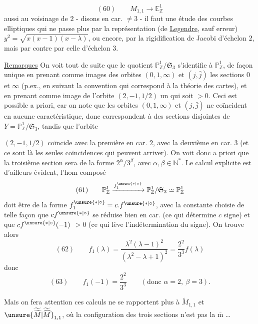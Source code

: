 \[
(60)\qquad
M_{1,1}\longrightarrow\mathbb E^1_{\mathbb Z}
\]
aussi au voisinage de $2$ - disons en car. $\ne 3$ - il faut une étude
des courbes elliptiques qui ne passe plus par la représentation
(de \uline{Legendre}, sauf erreur)
$y^{2}=\sqrt{x(x-1)(x-\lambda)}$, ou encore, par la rigidification de
Jacobi d'échelon $2$, mais par contre par celle d'échelon $3$.

\uline{Remarques} On voit tout de suite que le quotient
$\mathbb P^1_{\mathbb Z}/\mathfrak S_3$ s'identifie à
$\mathbb P^1_{\mathbb Z}$, de façon unique en prenant comme images des
orbites $(0,1,\infty)$ et $(j,\bar j)$ les sections $0$ et $\infty$
(p.ex., en suivant la convention qui correspond à la théorie des cartes),
et en prenant comme image de l'orbite $(2,-1,1/2)$ un
 qui soit $>0$.
Ceci est possible a priori, car on note que les 
orbites $(0,1,\infty)$ et $(j,\bar j)$
ne coïncident en aucune caractéristique, donc correspondent à des sections
disjointes de $Y=\mathbb P^1_{\mathbb Z}/\mathfrak S_3$,
tandis que l'orbite 

$(2,-1,1/2)$ coïncide avec la première en car. $2$, avec la deuxième en
car. $3$ (et ce sont là les seules coïncidences qui peuvent arriver).
On voit donc a priori que la troisième section sera de la forme
$2^\alpha/3^\beta$, avec $\alpha,\beta\in\mathbb N^*$.
Le calcul explicite est d'ailleurs évident, l'hom composé
\[
(61)\qquad
\mathbb P^1_{\mathbb Z}
\xrightarrow{f_1^{\unsure{*|\circ}}}
\mathbb P^1_{\mathbb Z}/\mathfrak S_3
\simeq\mathbb P^1_{\mathbb Z}
\]
doit être de la forme
$f_1^{\unsure{*|\circ}}=c.f^{\unsure{*|\circ}}$, avec la constante
 choisie de telle façon que
$cf^{\unsure{*|\circ}}$  se réduise bien en
 car. (ce qui détermine $c$  signe)
et que
$cf^{\unsure{*|\circ}}(-1)$  $>0$
(ce qui lève l'indétermination du signe).
On trouve alors
\[
(62)\qquad
f_1(\lambda)=
\frac{\lambda^2(\lambda-1)^2}{(\lambda^2-\lambda+1)^{2}}
=\frac{2^2}{3^3}f(\lambda)
\]
donc
\[
(63)\qquad
f_1(-1)=\frac{2^2}{3^3}
\qquad(\text{donc }\alpha=2,\ \beta=3).
\]

Mais on fera attention 
ces calculs ne se rapportent plus à $\widetilde M_{1,1}$ et
$\unsure{\widetilde{\widetilde M}|\widetilde{\widehat M}}_{1,1}$,
où la configuration des trois sections
n'est pas la $\overline{\mathrm m}$ \ldots
{}

